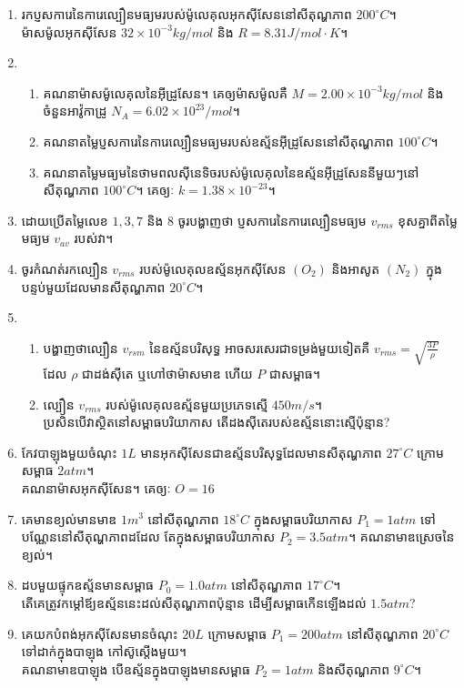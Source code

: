 \documentclass[12pt, a4paper]{article}
\begin{document}
\begin{enumerate}[m]
	\item រកប្ញសការេនៃការេល្បឿនមធ្យមរបស់ម៉ូលេគុលអុកសុីសែននៅសីតុណ្ហភាព $200^\circ C$។ \\ម៉ាសម៉ូលអុកសុីសែន $32\times10^{-3}kg/mol$ និង $R=8.31J/mol\cdot K$។
	\item \begin{enumerate}[k]
		\item គណនាម៉ាសម៉ូលេគុលនៃអុីដ្រូសែន។ គេឲ្យម៉ាសម៉ូលគឺ $M=2.00\times10^{-3}kg/mol$ និងចំនួនអាវ៉ូកាដ្រូ $N_{A}=6.02\times10^{23}/mol$។
		\item គណនាតម្លៃប្ញសការេនៃការេល្បឿនមធ្យមរបស់ឧស្ម័នអុីដ្រូសែននៅសីតុណ្ហភាព $100^\circ C$។
		\item គណនាតម្លៃមធ្យមនៃថាមពលសុីនេទិចរបស់ម៉ូលេគុលនៃឧស្ម័នអុីដ្រូសែននីមួយៗនៅសីតុណ្ហភាព $100^\circ C$។ គេឲ្យៈ $k=1.38\times10^{-23}$។
	\end{enumerate}
	\item ដោយប្រើតម្លៃលេខ $1,3,7$ និង $8$ ចូរបង្ហាញថា ប្ញសការេនៃការេល្បឿនមធ្យម $v_{rms}$ ខុសគ្នាពីតម្លៃមធ្យម $v_{av}$ របស់វា។
	\item ចូរកំណត់រកល្បឿន $v_{rms}$ របស់ម៉ូលេគុលឧស្ម័នអុកសុីសែន $\left(O_{2}\right)$ និងអាសូត $\left(N_2\right)$ ក្នុងបន្ទប់មួយដែលមានសីតុណ្ហភាព $20^\circ C$។
	\item \begin{enumerate}[k]
		\item បង្ហាញថាល្បឿន $v_{rsm}$ នៃឧស្ម័នបរិសុទ្ធ អាចសរសេរជាទម្រង់មួយទៀតគឺ $v_{rms}=\sqrt{\frac{3P}{\rho}}$ ដែល $\rho$ ជាដង់សុីតេ ឬហៅថាម៉ាសមាឌ ហើយ $P$ ជាសម្ពាធ។
		\item ល្បឿន $v_{rms}$ របស់ម៉ូលេគុលឧស្ម័នមួយប្រភេទស្មើ $450m/s$។\\ ប្រសិនបើវាស្ថិតនៅសម្ពាធបរិយាកាស តើដងសុីតេរបស់ឧស្ម័ននោះស្មើប៉ុន្មាន?
	\end{enumerate}
	\item កែវបាឡុងមួយចំណុះ $1L$ មានអុកសុីសែនជាឧស្ម័នបរិសុទ្ធដែលមានសីតុណ្ហភាព $27^\circ C$ ក្រោមសម្ពាធ $2atm$។\\
	គណនាម៉ាសអុកសុីសែន។ គេឲ្យៈ $O=16$
	\item គេមានខ្យល់មានមាឌ $1m^3$ នៅសីតុណ្ហភាព $18^\circ C$ ក្នុងសម្ពាធបរិយាកាស $P_{1}=1atm$ ទៅបណ្ណែននៅសីតុណ្ហភាពដដែល តែក្នុងសម្ពាធបរិយាកាស $P_{2}=3.5atm$។ គណនាមាឌស្រេចនៃខ្យល់។
	\item ដបមួយផ្ទុកឧស្ម័នមានសម្ពាធ $P_{0}=1.0atm$ នៅសីតុណ្ហភាព $17^\circ C$។\\
	តើគេត្រូវកម្តៅឪ្យឧស្ម័ននេះដល់សីតុណ្ហភាពប៉ុន្មាន ដើម្បីសម្ពាធកើនឡើងដល់ $1.5atm$?
	\item គេយកបំពង់អុកសុីសែនមានចំណុះ $20L$ ក្រោមសម្ពាធ $P_{1}=200atm$ នៅសីតុណ្ហភាព $20^\circ C$ ទៅដាក់ក្នុងបាឡុង កៅស៊ូស្តើងមួយ។ \\គណនាមាឌបាឡុង បើឧស្ម័នក្នុងបាឡុងមានសម្ពាធ $P_{2}=1atm$ និងសីតុណ្ហភាព $9^\circ C$។
	
\end{enumerate}
\end{document}
